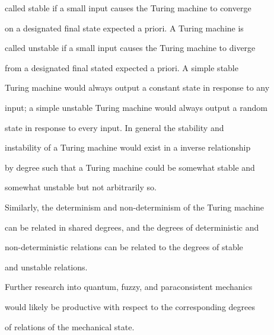 called stable if a small input causes the Turing machine to converge

on a designated final state expected a priori. A Turing machine is

called unstable if a small input causes the Turing machine to diverge

from a designated final stated expected a priori. A simple stable

Turing machine would always output a constant state in response to any

input; a simple unstable Turing machine would always output a random

state in response to every input. In general the stability and

instability of a Turing machine would exist in a inverse relationship

by degree such that a Turing machine could be somewhat stable and

somewhat unstable but not arbitrarily so.

Similarly, the determinism and non-determinism of the Turing machine

can be related in shared degrees, and the degrees of deterministic and

non-deterministic relations can be related to the degrees of stable

and unstable relations.

Further research into quantum, fuzzy, and paraconsistent mechanics

would likely be productive with respect to the corresponding degrees

of relations of the mechanical state.
